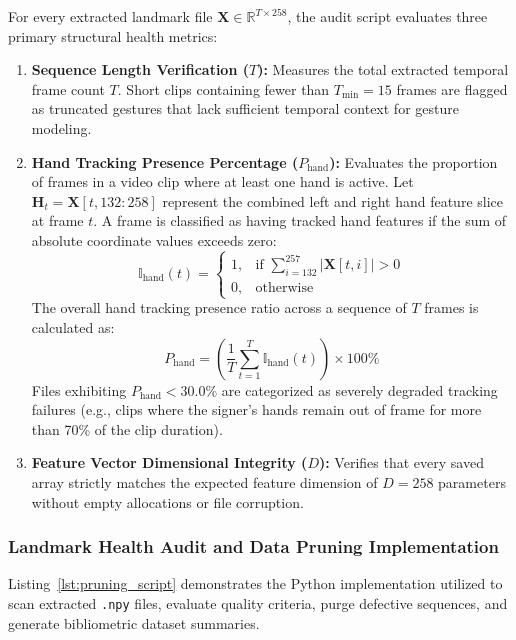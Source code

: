 \documentclass[12pt,a4paper]{article}
\begin{document}
For every extracted landmark file $\mathbf{X} \in \mathbb{R}^{T \times 258}$, the audit script evaluates three primary structural health metrics:

\begin{enumerate}
    \item \textbf{Sequence Length Verification ($T$):} Measures the total extracted temporal frame count $T$. Short clips containing fewer than $T_{\text{min}} = 15$ frames are flagged as truncated gestures that lack sufficient temporal context for gesture modeling.
    \item \textbf{Hand Tracking Presence Percentage ($P_{\text{hand}}$):} Evaluates the proportion of frames in a video clip where at least one hand is active. Let $\mathbf{H}_{t} = \mathbf{X}[t, 132:258]$ represent the combined left and right hand feature slice at frame $t$. A frame is classified as having tracked hand features if the sum of absolute coordinate values exceeds zero:
    \begin{equation}
    \mathbb{I}_{\text{hand}}(t) = \begin{cases} 
    1, & \text{if } \sum_{i=132}^{257} |\mathbf{X}[t, i]| > 0 \\ 
    0, & \text{otherwise} 
    \end{cases}
    \end{equation}
    The overall hand tracking presence ratio across a sequence of $T$ frames is calculated as:
    \begin{equation}
    P_{\text{hand}} = \left( \frac{1}{T} \sum_{t=1}^{T} \mathbb{I}_{\text{hand}}(t) \right) \times 100\%
    \end{equation}
    Files exhibiting $P_{\text{hand}} < 30.0\%$ are categorized as severely degraded tracking failures (e.g., clips where the signer's hands remain out of frame for more than 70\% of the clip duration).
    \item \textbf{Feature Vector Dimensional Integrity ($D$):} Verifies that every saved array strictly matches the expected feature dimension of $D = 258$ parameters without empty allocations or file corruption.
\end{enumerate}

\subsubsection{Landmark Health Audit and Data Pruning Implementation}

Listing~\ref{lst:pruning_script} demonstrates the Python implementation utilized to scan extracted \texttt{.npy} files, evaluate quality criteria, purge defective sequences, and generate bibliometric dataset summaries.
\end{document}
